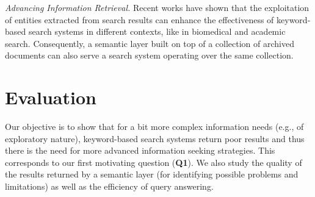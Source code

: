\documentclass[twocolumn]{svjour3}
\begin{document}
\vspace{2mm} \noindent
{\em Advancing Information Retrieval.}
Recent works have shown that the exploitation of
entities extracted from search results can enhance the effectiveness of keyword-based
search systems in different contexts,
like in biomedical \cite{fafalios2017jasist} and academic \cite{xiong2017explicit} search.
Consequently, a semantic layer built on top of a collection of archived documents
can also serve a search system operating over the same collection.





\section{Evaluation}
\label{sec:eval}

Our objective is to show that
for a bit more complex information needs (e.g., of exploratory nature),
keyword-based search systems return poor results and thus
there is the need for more advanced information seeking strategies.
This corresponds to our first motivating question ({\bf Q1}).
We also study the quality of the results returned by a semantic layer
(for identifying possible problems and limitations)
as well as the efficiency of query answering.
\end{document}
